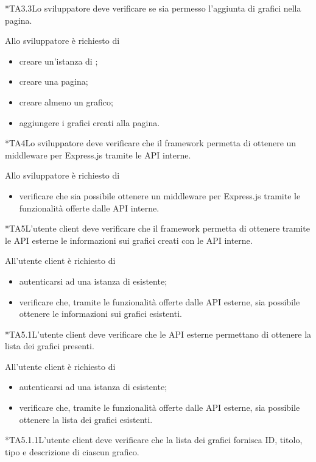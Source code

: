 	*{TA3.3}Lo sviluppatore deve verificare se sia permesso l'aggiunta di grafici nella pagina.
		
		Allo sviluppatore è richiesto di
		\begin{itemize}
			\item creare un'istanza di \projectname{};
			\item creare una pagina;
			\item creare almeno un grafico;
			\item aggiungere i grafici creati alla pagina.
		\end{itemize}

	*{TA4}Lo sviluppatore deve verificare che il framework permetta di ottenere un middleware per Express.js tramite le API interne.
		
		Allo sviluppatore è richiesto di
		\begin{itemize}
			\item verificare che sia possibile ottenere un middleware per Express.js tramite le funzionalità offerte dalle API interne.
		\end{itemize}

	*{TA5}L'utente client deve verificare che il framework permetta di ottenere tramite le API esterne le informazioni sui grafici creati con le API interne.

		All'utente client è richiesto di
		\begin{itemize}
			\item autenticarsi ad una istanza di \projectname{} esistente;
			\item verificare che, tramite le funzionalità offerte dalle API esterne, sia possibile ottenere le informazioni sui grafici esistenti.
		\end{itemize}

	*{TA5.1}L'utente client deve verificare che le API esterne permettano di ottenere la lista dei grafici presenti.

		All'utente client è richiesto di
		\begin{itemize}
			\item autenticarsi ad una istanza di \projectname{} esistente;
			\item verificare che, tramite le funzionalità offerte dalle API esterne, sia possibile ottenere la lista dei grafici esistenti.
		\end{itemize}

	*{TA5.1.1}L'utente client deve verificare che la lista dei grafici fornisca ID, titolo, tipo e descrizione di ciascun grafico.
		
